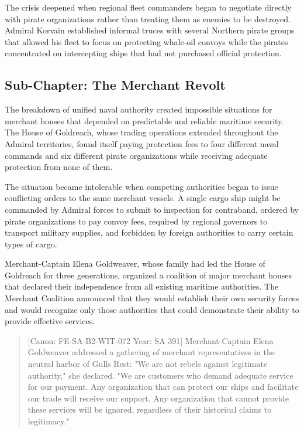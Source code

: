 The crisis deepened when regional fleet commanders began to negotiate
directly with pirate organizations rather than treating them as enemies
to be destroyed. Admiral Korvain established informal truces with
several Northern pirate groups that allowed his fleet to focus on
protecting whale-oil convoys while the pirates concentrated on
intercepting ships that had not purchased official protection.

\subsection{Sub-Chapter: The Merchant
Revolt}\label{sub-chapter-the-merchant-revolt}

The breakdown of unified naval authority created impossible situations
for merchant houses that depended on predictable and reliable maritime
security. The House of Goldreach, whose trading operations extended
throughout the Admiral territories, found itself paying protection fees
to four different naval commands and six different pirate organizations
while receiving adequate protection from none of them.

The situation became intolerable when competing authorities began to
issue conflicting orders to the same merchant vessels. A single cargo
ship might be commanded by Admiral forces to submit to inspection for
contraband, ordered by pirate organizations to pay convoy fees, required
by regional governors to transport military supplies, and forbidden by
foreign authorities to carry certain types of cargo.

Merchant-Captain Elena Goldweaver, whose family had led the House of
Goldreach for three generations, organized a coalition of major merchant
houses that declared their independence from all existing maritime
authorities. The Merchant Coalition announced that they would establish
their own security forces and would recognize only those authorities
that could demonstrate their ability to provide effective services.

\begin{quote}
{[}Canon: FE-SA-B2-WIT-072 \textbar{} Year: SA 391{]} Merchant-Captain
Elena Goldweaver addressed a gathering of merchant representatives in
the neutral harbor of Gull\textquotesingle s Rest: "We are not rebels
against legitimate authority," she declared. "We are customers who
demand adequate service for our payment. Any organization that can
protect our ships and facilitate our trade will receive our support. Any
organization that cannot provide these services will be ignored,
regardless of their historical claims to legitimacy."
\end{quote}

